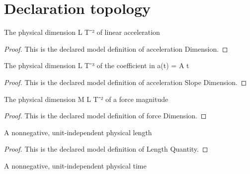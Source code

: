 \section{Declaration topology}
\begin{definition}
  \label{def:physics:phyx-mini-0772:phyxminiproblems-problemphyxmini0772-accelerationdimension}
  The physical dimension L T⁻² of linear acceleration
\end{definition}
\begin{proof}
  This is the declared model definition of acceleration Dimension.
\end{proof}
\begin{definition}
  \label{def:physics:phyx-mini-0772:phyxminiproblems-problemphyxmini0772-accelerationslopedimension}
  The physical dimension L T⁻³ of the coefficient in a(t) = A t
\end{definition}
\begin{proof}
  This is the declared model definition of acceleration Slope Dimension.
\end{proof}
\begin{definition}
  \label{def:physics:phyx-mini-0772:phyxminiproblems-problemphyxmini0772-forcedimension}
  The physical dimension M L T⁻² of a force magnitude
\end{definition}
\begin{proof}
  This is the declared model definition of force Dimension.
\end{proof}
\begin{definition}
  \label{def:physics:phyx-mini-0772:phyxminiproblems-problemphyxmini0772-lengthquantity}
  A nonnegative, unit-independent physical length
\end{definition}
\begin{proof}
  This is the declared model definition of Length Quantity.
\end{proof}
\begin{definition}
  \label{def:physics:phyx-mini-0772:phyxminiproblems-problemphyxmini0772-timequantity}
  A nonnegative, unit-independent physical time
\end{definition}
